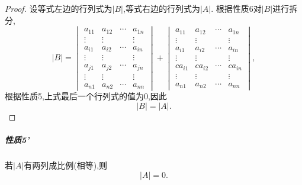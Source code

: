 \begin{proof}
  设等式左边的行列式为$|B|$,等式右边的行列式为$|A|$.
  根据性质6对$|B|$进行拆分,
  \[
    |B|=
  \begin{vmatrix}
    a_{11}&a_{12}&\cdots&a_{1n}\\
    \vdots&\vdots&&\vdots\\
    a_{i1}&a_{i2}&\cdots&a_{in}\\
    \vdots&\vdots&&\vdots\\
    a_{j1}&a_{j2}&\cdots&a_{jn}\\
    \vdots&\vdots&&\vdots\\    
    a_{n1}&a_{n2}&\cdots&a_{nn}
  \end{vmatrix} +
  \begin{vmatrix}
    a_{11}&a_{12}&\cdots&a_{1n}\\
    \vdots&\vdots&&\vdots\\
    a_{i1}&a_{i2}&\cdots&a_{in}\\
    \vdots&\vdots&&\vdots\\
    ca_{i1}&ca_{i2}&\cdots&ca_{in}\\
    \vdots&\vdots&&\vdots\\    
    a_{n1}&a_{n2}&\cdots&a_{nn}
  \end{vmatrix},
  \]
  根据性质5,上式最后一个行列式的值为$0$,因此
  \[
    |B|=|A|.
  \]
\end{proof}

\subparagraph{\color{ecolor}性质5'}

若$|A|$有两列成比例(相等),则
\[
  |A|=0.
\]


